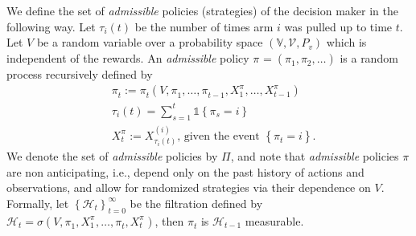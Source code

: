 \documentclass[final,12pt]{colt2018}
\newcommand{\prn}[1]{\left( #1 \right)}
\newcommand{\brc}[1]{\left\lbrace #1 \right\rbrace}
\newcommand{\indEvent}[1]{\mathds{1}{\brc{#1}}}
\newcommand{\seqDef}[3]{\brc{#1}_{#2}^{#3}}
\newcommand{\XtPi}[1][t]{X_{#1}^{\policy}}
\newcommand{\Xti}[2][i]{X_{#2}^{(#1)}}
\newcommand{\policiesSet}{\Pi}
\newcommand{\policy}[1][]{\pi^{#1}}
\newcommand{\policyAt}[2][]{\policy[#1]_{#2}}
\newcommand{\Filtration}{\mathcal{H}}
\newcommand{\FiltrationAt}[1]{\Filtration_{#1}}
\newcommand{\tauIAt}[2][i]{\tau_{#1} \prn{#2}}
\begin{document}
	We define the set of \textit{admissible} policies (strategies) of the decision maker in the following way. Let $\tauIAt{t}$ be the number of times arm $i$ was pulled up to time $t$. Let $V$ be a random variable over a probability space $\prn{\mathbb{V}, \mathcal{V}, P_v}$ which is independent of the rewards. An \textit{admissible} policy $\policy = \prn{\policyAt{1}, \policyAt{2}, \ldots}$ is a random process recursively defined by
	\begin{align}
	&\policyAt{t} := \policyAt{t} \prn{V, \policyAt{1}, \ldots, \policyAt{t-1}, \XtPi[1], \ldots, \XtPi[t-1]} \\
	&\tauIAt{t} = \sum_{s=1}^{t} \indEvent{\policyAt{s} = i} \label{eq:tauIDef}\\
	&\XtPi := \Xti[i]{\tauIAt{t}} \text{, given the event } \brc{\policyAt{t} = i}.
	\end{align}
	We denote the set of \textit{admissible} policies by $\policiesSet$, and note that \textit{admissible} policies $\policy$ are non anticipating, i.e.,  depend only on the past history of actions and observations, and allow for randomized strategies via their dependence on $V$. Formally, let $\seqDef{\FiltrationAt{t}}{t=0}{\infty}$ be the filtration defined by $\FiltrationAt{t} = \sigma \prn{V, \policyAt{1},  \XtPi[1], \ldots, \policyAt{t}, \XtPi[t]}$, then  $\policyAt{t}$ is $\FiltrationAt{t-1}$ measurable.
	
	
	
	
\end{document}
